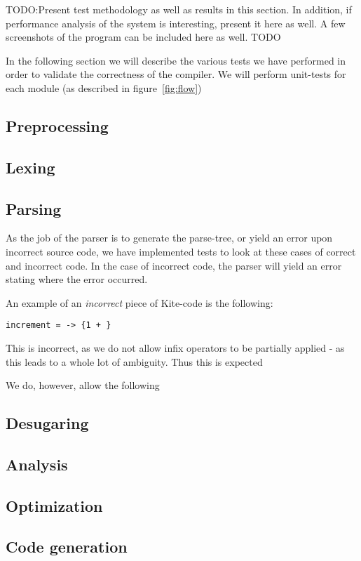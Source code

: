 TODO:Present test methodology as well as results in this section. In addition, if performance
analysis of the system is interesting, present it here as well.
A few screenshots of the program can be included here as well. TODO


In the following section we will describe the various tests we have performed in order to validate the correctness of the compiler. We will perform unit-tests for each module (as described in figure~\ref{fig:flow})

\subsection{Preprocessing}

\subsection{Lexing}

\subsection{Parsing}
As the job of the parser is to generate the parse-tree, or yield an error upon incorrect source code, we have implemented tests to look at these cases of correct and incorrect code. In the case of incorrect code, the parser will yield an error stating where the error occurred.

An example of an \emph{incorrect} piece of Kite-code is the following:

\texttt{increment =  -> \{1 + \}}

This is incorrect, as we do not allow infix operators to be partially applied - as this leads to a whole lot of ambiguity. Thus this is expected

We do, however, allow the following


\subsection{Desugaring}
\subsection{Analysis}
\subsection{Optimization}
\subsection{Code generation}


